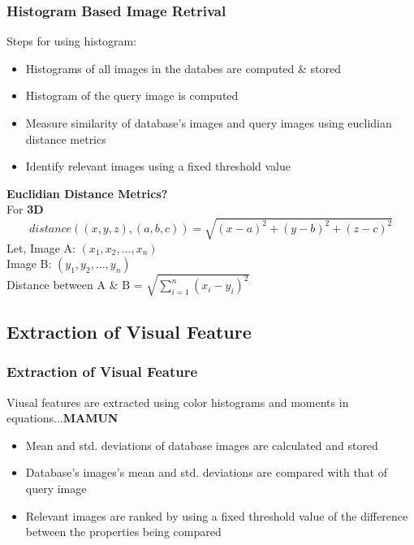 \documentclass[9pt]{beamer}
\begin{document}
\begin{frame}
\frametitle{Histogram Based Image Retrival}
Steps for using histogram:\\
\pause
\begin{itemize}[label=$\star$]
\setlength\itemsep{2em}

\item Histograms of all images in the databes are computed \& stored
\pause
\item Histogram of the query image is computed
\pause
\item Measure similarity of database's images and query images using euclidian distance metrics
\pause
\item Identify relevant images using a fixed threshold value\\[\baselineskip]
\end{itemize}
\pause
\textbf{Euclidian Distance Metrics?}\\[\baselineskip]
\pause
For \textbf{3D}
\begin{equation}
distance((x,y,z),(a,b,c)) = \sqrt{(x-a)^2+(y-b)^2+(z-c)^2}
\end{equation}
\pause
Let,
Image A: $(x_1, x_2,\ldots,x_n)$\\
Image B: $(y_1, y_2,\ldots,y_n)$\\[\baselineskip]
\pause
Distance between A \& B = $\sqrt{\sum_{i=1}^{n}(x_i-y_i)^2}$
\end{frame}

\subsection{Extraction of Visual Feature}
\begin{frame}
\frametitle{Extraction of Visual Feature}
\pause
Viusal features are extracted using color histograms and moments in equations...\textbf{MAMUN}\\[\baselineskip]
\pause
\begin{itemize}[label=$\star$]
\setlength\itemsep{2em}

\item Mean and std. deviations of database images are calculated and stored
\pause
\item Database's images's mean and std. deviations are compared with that of query image
\pause
\item Relevant images are ranked by using a fixed threshold value of the difference between the properties being compared\\[\baselineskip]
\pause
\end{itemize}
\end{frame}
\end{document}
